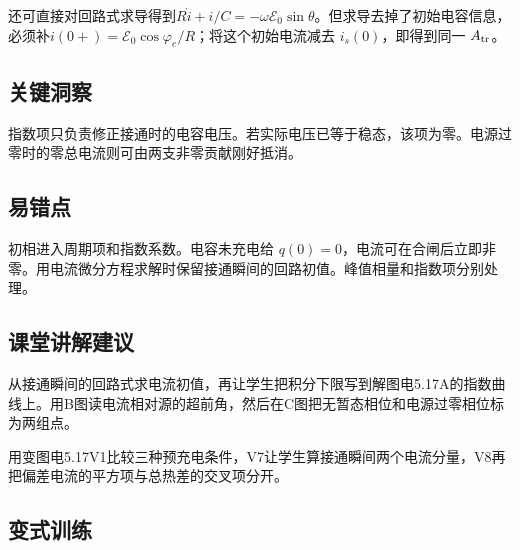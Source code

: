 \documentclass[UTF8,fontset=fandol,a4paper,11pt]{ctexart}
\begin{document}
还可直接对回路式求导得到$R\dot i+i/C=-\omega\mathcal E_0\sin\theta$。但求导去掉了初始电容信息，必须补$i(0+)=\mathcal E_0\cos\varphi_e/R$；将这个初始电流减去 $i_s(0)$，即得到同一 $A_{\rm tr}$。




\subsection*{关键洞察}

指数项只负责修正接通时的电容电压。若实际电压已等于稳态，该项为零。电源过零时的零总电流则可由两支非零贡献刚好抵消。



\subsection*{易错点}

初相进入周期项和指数系数。电容未充电给 $q(0)=0$，电流可在合闸后立即非零。用电流微分方程求解时保留接通瞬间的回路初值。峰值相量和指数项分别处理。



\subsection*{课堂讲解建议}

从接通瞬间的回路式求电流初值，再让学生把积分下限写到解图电5.17A的指数曲线上。用B图读电流相对源的超前角，然后在C图把无暂态相位和电源过零相位标为两组点。

用变图电5.17V1比较三种预充电条件，V7让学生算接通瞬间两个电流分量，V8再把偏差电流的平方项与总热差的交叉项分开。


\subsection*{变式训练}
\end{document}
